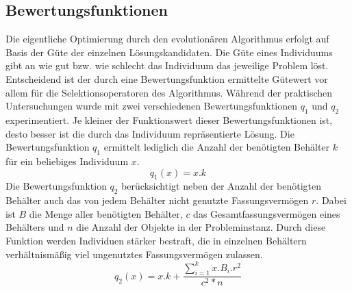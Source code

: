     \subsection{Bewertungsfunktionen}
    Die eigentliche Optimierung durch den evolutionären Algorithmus erfolgt auf Basis der Güte der einzelnen Lösungskandidaten. Die Güte eines Individuums gibt an wie gut bzw. wie schlecht das Individuum das jeweilige Problem löst. Entscheidend ist der durch eine Bewertungsfunktion ermittelte Gütewert vor allem für die Selektionsoperatoren des Algorithmus. Während der praktischen Untersuchungen wurde mit zwei verschiedenen Bewertungsfunktionen $q_1$ und $q_2$ experimentiert. Je kleiner der Funktionswert dieser Bewertungsfunktionen ist, desto besser ist die durch das Individuum repräsentierte Lösung. Die Bewertungsfunktion $q_1$ ermittelt lediglich die Anzahl der benötigten Behälter $k$ für ein beliebiges Individuum $x$.
    $$q_1(x) = x.k$$
    Die Bewertungsfunktion $q_2$ berücksichtigt neben der Anzahl der benötigten Behälter auch das von jedem Behälter nicht genutzte Fassungsvermögen $r$. Dabei ist $B$ die Menge aller benötigten Behälter, $c$ das Gesamtfassungsvermögen eines Behälters und $n$ die Anzahl der Objekte in der Probleminstanz. Durch diese Funktion werden Individuen stärker bestraft, die in einzelnen Behältern verhältnismäßig viel ungenutztes Fassungsvermögen zulassen. 
    $$q_2(x) = x.k + \frac{\displaystyle\sum_{i = 1}^{k} x.B_i.r^2}{c^2*n}$$

